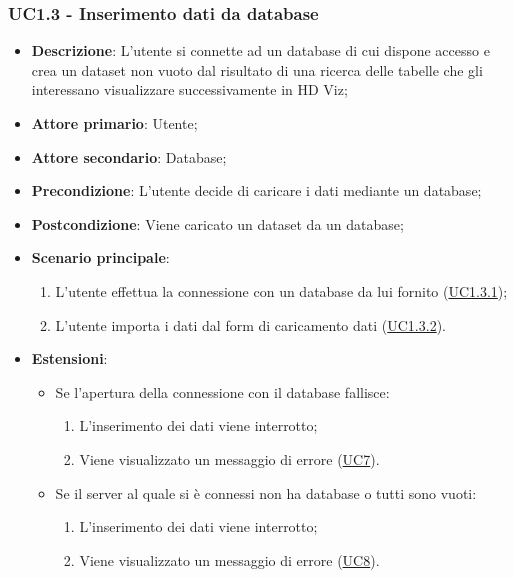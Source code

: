\subsubsection{UC1.3 - Inserimento dati da database}
\label{ssub:uc1.3}
\begin{itemize}
    \item \textbf{Descrizione}: L'utente si connette ad un database di cui dispone accesso e 
                                crea un dataset non vuoto dal risultato di una ricerca delle tabelle che gli interessano
                                visualizzare successivamente in HD Viz;
    \item \textbf{Attore primario}: Utente;
    
    \item \textbf{Attore secondario}: Database;
    
    \item \textbf{Precondizione}:   L'utente decide di caricare i dati mediante un database;
    \item \textbf{Postcondizione}:  Viene caricato un dataset da un database; 

	\item \textbf{Scenario principale}:
		\begin{enumerate}
			\item L'utente effettua la connessione con un database da lui fornito (\hyperref[par:uc1.3.1]{UC1.3.1});
			\item L'utente importa i dati dal form di caricamento dati (\hyperref[par:uc1.3.2]{UC1.3.2}).
        \end{enumerate}

    \item \textbf{Estensioni}:
    \begin{itemize}
        \item Se l'apertura della connessione con il database fallisce:
        \begin{enumerate}
            \item L'inserimento dei dati viene interrotto;
            \item Viene visualizzato un messaggio di errore (\hyperref[sub:uc7]{UC7}).
        \end{enumerate}

        \item Se il server al quale si è connessi non ha database o tutti sono vuoti:
        \begin{enumerate}
            \item L'inserimento dei dati viene interrotto;
            \item Viene visualizzato un messaggio di errore (\hyperref[sub:uc8]{UC8}).
        \end{enumerate}


\end{itemize}
\end{itemize}
